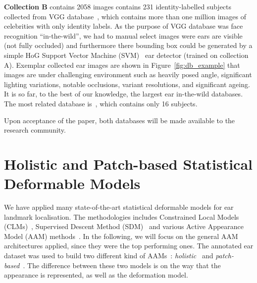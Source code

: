 \textbf{Collection B} contains 2058 images contains 231 identity-labelled subjects collected from VGG database~\cite{Parkhi15}, which contains more than one million images of celebrities with only identity labels. As the purpose of VGG database was face recognition ``in-the-wild'', we had to manual select images were ears are visible (not fully occluded) and furthermore there bounding box could be 
generated by a simple HoG Support Vector Machine (SVM)~\cite{Dalal2005}  ear detector (trained on collection A). Exemplar collected ear images are shown in Figure~\ref{fig:db_example} that images are under challenging environment such as heavily posed angle, significant lighting variations, notable occlusions, variant resolutions, and significant ageing. It is so far, to the best of our knowledge, the largest ear in-the-wild databases. The most related database is~\cite{emervsivc2015ear}, which contains only 16 subjects. 
\label{600EW}

Upon acceptance of the paper, both databases will be made available to the research community.





\section{Holistic and Patch-based Statistical Deformable Models}

We have applied many state-of-the-art statistical deformable models for ear landmark localisation. The methodologies includes Constrained Local Models (CLMs)~\cite{cristinacce2006feature}, Supervised Descent Method (SDM)~\cite{xiong2013supervised} and various Active Appearance Model (AAM) methods~\cite{Cootes2001, Matthews2004, Tzimiropoulos2014, antonakos2015feature}. In the following, we will focus on the general AAM architectures applied, since they were the top performing ones. The annotated ear dataset was used to  build two different kind of AAMs~\cite{Cootes2001, Matthews2004}: \emph{holistic}~\cite{ramnath2008increasing, Amberg2009, anderson2014using, antonakos2015feature} and \emph{patch-based}~\cite{Tzimiropoulos2014}. The difference between these two models is on the way that the appearance is represented, as well as the deformation model.


